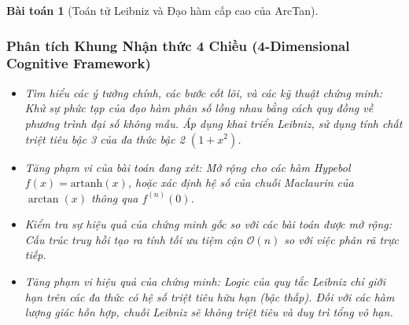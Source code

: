 \documentclass{article}
\newtheorem{baitoan}{Bài toán}
\begin{document}
\begin{baitoan}[Toán tử Leibniz và Đạo hàm cấp cao của ArcTan]


 \subsubsection*{Phân tích Khung Nhận thức 4 Chiều (4-Dimensional Cognitive Framework)}
 \begin{itemize}
 \item \textit{Tìm hiểu các ý tưởng chính, các bước cốt lõi, và các kỹ thuật chứng minh}: Khử sự phức tạp của đạo hàm phân số lồng nhau bằng cách quy đồng về phương trình đại số không mẫu. Áp dụng khai triển Leibniz, sử dụng tính chất triệt tiêu bậc 3 của đa thức bậc 2 $(1+x^2)$.
 \item \textit{Tăng phạm vi của bài toán đang xét}: Mở rộng cho các hàm Hypebol $f(x) = \text{artanh}(x)$, hoặc xác định hệ số của chuỗi Maclaurin của $\arctan(x)$ thông qua $f^{(n)}(0)$.
 \item \textit{Kiểm tra sự hiệu quả của chứng minh gốc so với các bài toán được mở rộng}: Cấu trúc truy hồi tạo ra tính tối ưu tiệm cận $\mathcal{O}(n)$ so với việc phân rã trực tiếp.
 \item \textit{Tăng phạm vi hiệu quả của chứng minh}: Logic của quy tắc Leibniz chỉ giới hạn trên các đa thức có hệ số triệt tiêu hữu hạn (bậc thấp). Đối với các hàm lượng giác hỗn hợp, chuỗi Leibniz sẽ không triệt tiêu và duy trì tổng vô hạn.
 \end{itemize}
\end{baitoan}

\end{document}
